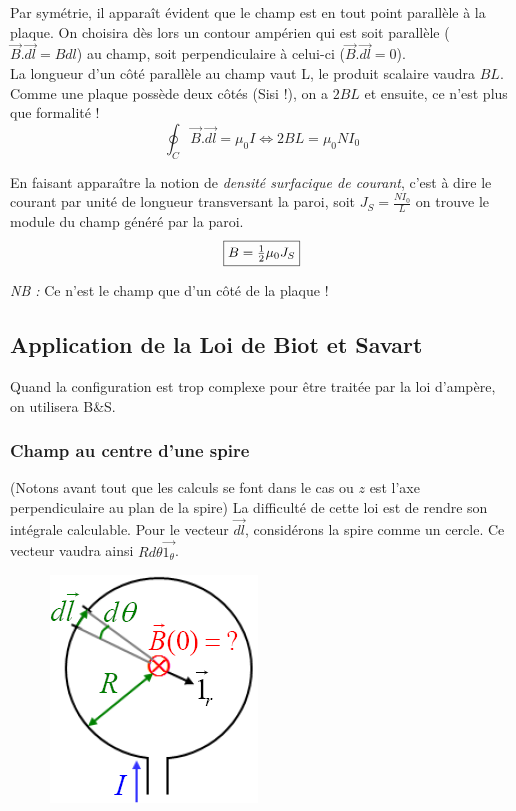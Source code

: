 \documentclass	[11pt, a4paper, openany]{book}
\begin{document}
Par symétrie, il apparaît évident que le champ est en tout point parallèle à la plaque. On choisira dès lors un contour ampérien qui est soit parallèle ($\vec{B}.\vec{dl} = Bdl$) au champ, soit perpendiculaire à celui-ci ($\vec{B}.\vec{dl} = 0$). \\
La longueur d'un côté parallèle au champ vaut L, le produit scalaire vaudra $BL$. Comme une plaque possède deux côtés (Sisi !), on a $2BL$ et ensuite, ce n'est plus que formalité ! 
\begin{equation}
	\oint_C \vec{B}.\vec{dl} = \mu_0I \Leftrightarrow 2BL = \mu_0N I_0
\end{equation}

En faisant apparaître la notion de \textit{densité surfacique de courant}, c'est à dire le courant par unité de longueur transversant la paroi, soit $J_S = \frac{NI_0}{L}$ on trouve le module du champ généré par la paroi.
\begin{equation}
	\fbox{$B = \frac{1}{2}\mu_0J_S$}
\end{equation}

\textit{NB :} Ce n'est le champ que d'un côté de la plaque !

\subsection{Application de la Loi de Biot et Savart}
Quand la configuration est trop complexe pour être traitée par la loi d'ampère, on utilisera B\&S.

\subsubsection{Champ au centre d'une spire}
(Notons avant tout que les calculs se font dans le cas ou $z$ est l'axe perpendiculaire au plan de la spire)
La difficulté de cette loi est de rendre son intégrale calculable. Pour le vecteur $\vec{dl}$, considérons la spire comme  un cercle. Ce vecteur vaudra ainsi $Rd\theta\vec{1_\theta}$. 

\begin{figure}
	\includegraphics[scale=0.55]{magneto/image8.png}
\end{figure}
\end{document}
